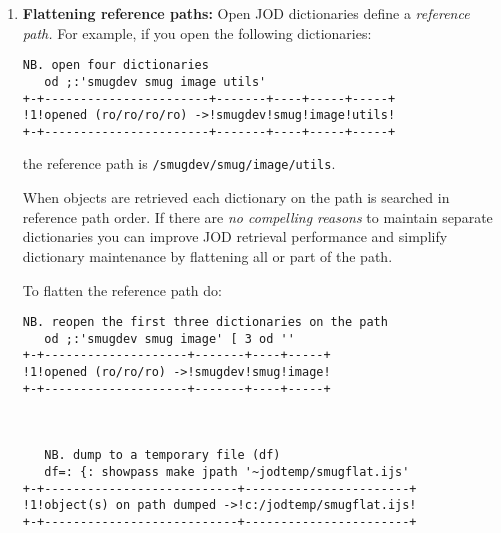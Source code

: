 \begin{enumerate}
\item
  \textbf{Flattening reference paths:} Open JOD dictionaries define a
  \emph{reference path.} For example, if you open the following
  dictionaries:
  
%
%
%

\begin{lstlisting}[language=jdoc,escapechar=*,frame=single,framerule=0pt,label=lst:scr5077X1]
   NB. open four dictionaries   
   od ;:'smugdev smug image utils'
+-+-----------------------+-------+----+-----+-----+
!1!opened (ro/ro/ro/ro) ->!smugdev!smug!image!utils!
+-+-----------------------+-------+----+-----+-----+
\end{lstlisting}

  the reference path is \texttt{/smugdev/smug/image/utils}.

  When objects are retrieved each dictionary on the path is searched in
  reference path order. If there are \emph{no compelling reasons} to
  maintain separate dictionaries you can improve JOD retrieval
  performance and simplify dictionary maintenance by flattening all or
  part of the path.

  To flatten the reference path do:

\begin{lstlisting}[language=jdoc, frame=single,framerule=0pt,label=lst:scr5077X2]
   NB. reopen the first three dictionaries on the path   
   od ;:'smugdev smug image' [ 3 od ''
+-+--------------------+-------+----+-----+
!1!opened (ro/ro/ro) ->!smugdev!smug!image!
+-+--------------------+-------+----+-----+



   NB. dump to a temporary file (df)   
   df=: {: showpass make jpath '~jodtemp/smugflat.ijs'
+-+---------------------------+-----------------------+
!1!object(s) on path dumped ->!c:/jodtemp/smugflat.ijs!
+-+---------------------------+-----------------------+


\end{lstlisting}
\end{enumerate}
